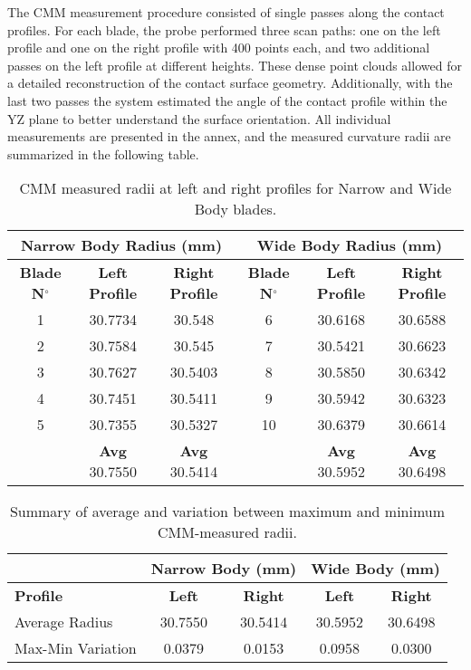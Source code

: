 The CMM measurement procedure consisted of single passes along the contact profiles. For each blade, the probe performed three scan paths: one on the left profile and one on the right profile with 400 points each, and two additional passes on the left profile at different heights. These dense point clouds allowed for a detailed reconstruction of the contact surface geometry.
Additionally, with the last two passes the system estimated the angle of the contact profile within the YZ plane to better understand the surface orientation. All individual measurements are presented in the annex, and the measured curvature radii are summarized in the following table.

\begin{table}[H]
    \centering
    \caption{CMM measured radii at left and right profiles for Narrow and Wide Body blades.}
    \begin{tabular}{ccc|ccc}
    \hline
    \multicolumn{3}{c}{\textbf{Narrow Body Radius (mm)}} & \multicolumn{3}{c}{\textbf{Wide Body Radius (mm)}} \\ \hline
    \textbf{Blade N$^{\circ}$} & \textbf{Left Profile} & \textbf{Right Profile} & \textbf{Blade N$^{\circ}$} & \textbf{Left Profile} & \textbf{Right Profile} \\ \hline
    1 & 30.7734 & 30.548  & 6 & 30.6168 & 30.6588 \\
    2 & 30.7584 & 30.545  & 7 & 30.5421 & 30.6623 \\
    3 & 30.7627 & 30.5403 & 8 & 30.5850 & 30.6342 \\ 
    4 & 30.7451 & 30.5411 & 9 & 30.5942 & 30.6323 \\ 
    5 & 30.7355 & 30.5327 & 10 & 30.6379 & 30.6614 \\ \hline
     & \textbf{Avg} 30.7550 & \textbf{Avg} 30.5414 & & \textbf{Avg} 30.5952 & \textbf{Avg} 30.6498 \\ \hline
    \end{tabular}
\end{table}
    
\begin{table}[H]
    \centering
    \caption{Summary of average and variation between maximum and minimum CMM-measured radii.}
    \label{tab:radii}
    \begin{tabular}{l|cc|cc}
        \hline
        \textbf{} & \multicolumn{2}{c|}{\textbf{Narrow Body (mm)}} & \multicolumn{2}{c}{\textbf{Wide Body (mm)}} \\ \hline
        \textbf{Profile} & \textbf{Left} & \textbf{Right} & \textbf{Left} & \textbf{Right} \\ \hline
        Average Radius & 30.7550 & 30.5414 & 30.5952 & 30.6498 \\
        Max-Min Variation & 0.0379 & 0.0153 & 0.0958 & 0.0300 \\ \hline
    \end{tabular}
\end{table}

